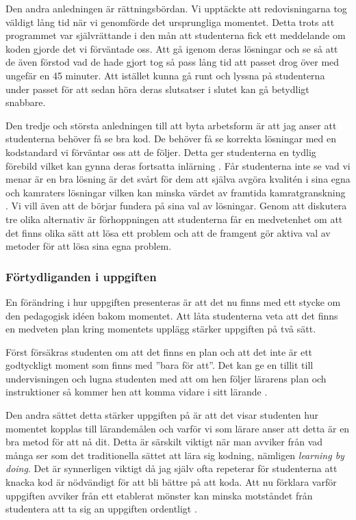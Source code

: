 \documentclass[a4paper, 10pt]{article}
\begin{document}
Den andra anledningen är rättningsbördan. Vi 
upptäckte att redovisningarna tog väldigt lång 
tid när vi genomförde det ursprungliga momentet.
Detta trots att programmet var självrättande i 
den mån att studenterna fick ett meddelande om 
koden gjorde det vi förväntade oss. Att gå igenom 
deras lösningar och se så att de även förstod 
vad de hade gjort tog så pass lång tid att passet 
drog över med ungefär en 45 minuter. Att istället 
kunna gå runt och lyssna på studenterna under 
passet för att sedan höra deras slutsatser i 
slutet kan gå betydligt snabbare.

Den tredje och största anledningen till att 
byta arbetsform är att jag anser att studenterna 
behöver få se bra kod. De behöver få se korrekta 
lösningar med en kodstandard vi förväntar oss att 
de följer. Detta ger studenterna en tydlig 
förebild vilket kan gynna deras fortsatta 
inlärning \parencite[91]{elmgrenolding2025}  .
Får studenterna inte se vad vi menar är en bra 
lösning är det svårt för dem att själva avgöra 
kvalitén i sina egna och kamraters lösningar 
vilken kan minska värdet av framtida 
kamratgranskning \parencite[sida 280]{elmgrenolding2025}. Vi vill även att de börjar 
fundera på sina val av lösningar. Genom att 
diskutera tre olika alternativ är förhoppningen 
att studenterna får en medvetenhet om att det 
finns olika sätt att lösa ett problem och att 
de framgent gör aktiva val av metoder för att 
lösa sina egna problem. 

\subsubsection{Förtydliganden i uppgiften}

En förändring i hur uppgiften presenteras 
är att det nu finns med ett stycke om den
pedagogisk idéen bakom momentet. Att låta 
studenterna veta att det finns en medveten 
plan kring momentets upplägg stärker 
uppgiften på två sätt.

Först försäkras studenten om att det 
finns en plan och att det inte är ett 
godtyckligt moment som finns med ''bara för 
att''. Det kan ge en tillit till 
undervisningen och lugna studenten med att 
om hen följer lärarens plan och instruktioner 
så kommer hen att komma vidare i sitt lärande
\parencite[sida 123]{branden2022}.

Den andra sättet detta stärker uppgiften på 
är att det visar studenten hur momentet 
kopplas till lärandemålen och varför vi som 
lärare anser att detta är en bra metod för att 
nå dit. Detta är särskilt viktigt när man 
avviker från vad många ser som det traditionella 
sättet att lära sig kodning, nämligen 
\textit{learning by doing}. Det är synnerligen 
viktigt då jag själv ofta repeterar för 
studenterna att knacka kod är nödvändigt för 
att bli bättre på att koda. Att nu förklara 
varför uppgiften avviker från ett etablerat 
mönster kan minska motståndet från studentera 
att ta sig an uppgiften ordentligt 
\parencite[sida 160]{branden2022}.
\end{document}
